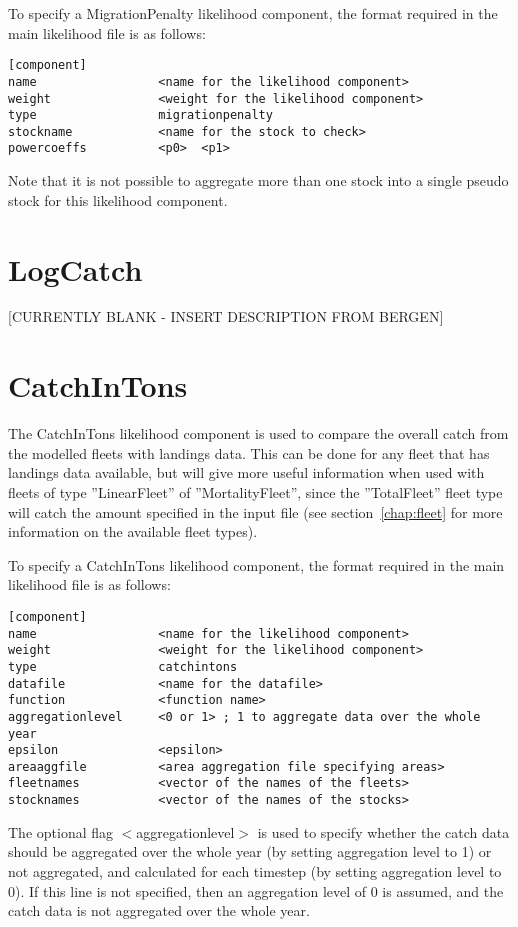 \documentclass [a4paper, 10pt]{book}
\begin{document}
\bigskip
To specify a MigrationPenalty likelihood component, the format required in the main likelihood file is as follows:

{\small\begin{verbatim}
[component]
name                 <name for the likelihood component>
weight               <weight for the likelihood component>
type                 migrationpenalty
stockname            <name for the stock to check>
powercoeffs          <p0>  <p1>
\end{verbatim}}

Note that it is not possible to aggregate more than one stock into a single pseudo stock for this likelihood component.

\section{LogCatch}\label{sec:logcatch}
[CURRENTLY BLANK - INSERT DESCRIPTION FROM BERGEN]

\section{CatchInTons}\label{sec:catchintons}
The CatchInTons likelihood component is used to compare the overall catch from the modelled fleets with landings data.  This can be done for any fleet that has landings data available, but will give more useful information when used with fleets of type ''LinearFleet'' of ''MortalityFleet'', since the ''TotalFleet'' fleet type will catch the amount specified in the input file (see section~\ref{chap:fleet} for more information on the available fleet types).

\bigskip
To specify a CatchInTons likelihood component, the format required in the main likelihood file is as follows:

{\small\begin{verbatim}
[component]
name                 <name for the likelihood component>
weight               <weight for the likelihood component>
type                 catchintons
datafile             <name for the datafile>
function             <function name>
aggregationlevel     <0 or 1> ; 1 to aggregate data over the whole year
epsilon              <epsilon>
areaaggfile          <area aggregation file specifying areas>
fleetnames           <vector of the names of the fleets>
stocknames           <vector of the names of the stocks>
\end{verbatim}}

The optional flag $<$aggregationlevel$>$ is used to specify whether the catch data should be aggregated over the whole year (by setting aggregation level to 1) or not aggregated, and calculated for each timestep (by setting aggregation level to 0).  If this line is not specified, then an aggregation level of 0 is assumed, and the catch data is not aggregated over the whole year.
\end{document}
